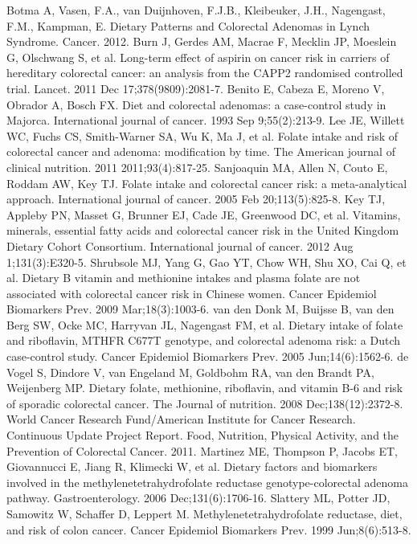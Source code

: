 \begin{thebibliography}{12}
		Botma A, Vasen, F.A., van Duijnhoven, F.J.B., Kleibeuker, J.H., Nagengast, F.M., Kampman, E. Dietary Patterns and Colorectal Adenomas in Lynch Syndrome. Cancer. 2012. 
		Burn J, Gerdes AM, Macrae F, Mecklin JP, Moeslein G, Olschwang S, et al. Long-term effect of aspirin on cancer risk in carriers of hereditary colorectal cancer: an analysis from the CAPP2 randomised controlled trial. Lancet. 2011 Dec 17;378(9809):2081-7. 
		Benito E, Cabeza E, Moreno V, Obrador A, Bosch FX. Diet and colorectal adenomas: a case-control study in Majorca. International journal of cancer. 1993 Sep 9;55(2):213-9. 
		Lee JE, Willett WC, Fuchs CS, Smith-Warner SA, Wu K, Ma J, et al. Folate intake and risk of colorectal cancer and adenoma: modification by time. The American journal of clinical nutrition. 2011 2011;93(4):817-25. 
		Sanjoaquin MA, Allen N, Couto E, Roddam AW, Key TJ. Folate intake and colorectal cancer risk: a meta-analytical approach. International journal of cancer. 2005 Feb 20;113(5):825-8. 
		Key TJ, Appleby PN, Masset G, Brunner EJ, Cade JE, Greenwood DC, et al. Vitamins, minerals, essential fatty acids and colorectal cancer risk in the United Kingdom Dietary Cohort Consortium. International journal of cancer. 2012 Aug 1;131(3):E320-5. 
		Shrubsole MJ, Yang G, Gao YT, Chow WH, Shu XO, Cai Q, et al. Dietary B vitamin and methionine intakes and plasma folate are not associated with colorectal cancer risk in Chinese women. Cancer Epidemiol Biomarkers Prev. 2009 Mar;18(3):1003-6. 
		van den Donk M, Buijsse B, van den Berg SW, Ocke MC, Harryvan JL, Nagengast FM, et al. Dietary intake of folate and riboflavin, MTHFR C677T genotype, and colorectal adenoma risk: a Dutch case-control study. Cancer Epidemiol Biomarkers Prev. 2005 Jun;14(6):1562-6. 
		de Vogel S, Dindore V, van Engeland M, Goldbohm RA, van den Brandt PA, Weijenberg MP. Dietary folate, methionine, riboflavin, and vitamin B-6 and risk of sporadic colorectal cancer. The Journal of nutrition. 2008 Dec;138(12):2372-8. 
		World Cancer Research Fund/American Institute for Cancer Research. Continuous Update Project Report. Food, Nutrition, Physical Activity, and the Prevention of Colorectal Cancer. 2011. 
		Martinez ME, Thompson P, Jacobs ET, Giovannucci E, Jiang R, Klimecki W, et al. Dietary factors and biomarkers involved in the methylenetetrahydrofolate reductase genotype-colorectal adenoma pathway. Gastroenterology. 2006 Dec;131(6):1706-16. 
		Slattery ML, Potter JD, Samowitz W, Schaffer D, Leppert M. Methylenetetrahydrofolate reductase, diet, and risk of colon cancer. Cancer Epidemiol Biomarkers Prev. 1999 Jun;8(6):513-8. 

\end{thebibliography}
